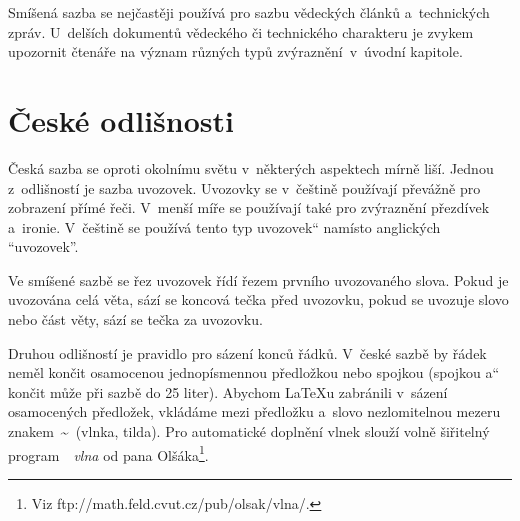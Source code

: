 \documentclass[a4paper, 11pt, twocolumn]{article}
\newcommand{\myuv}[1]{\quotedblbase #1\textquotedblleft}
\begin{document}
Smíšená sazba se nejčastěji používá pro sazbu vě\-dec\-kých článků a~technických zpráv. U~delších do\-ku\-men\-tů vědeckého či technického charakteru je zvykem upozornit čtenáře na význam různých typů zvý\-raz\-ně\-ní~v~úvodní kapitole.

\section{České odlišnosti}
Česká sazba se oproti okolnímu světu v~některých aspektech mírně liší. Jednou z~odlišností je sazba uvozovek. Uvozovky se v~češtině používají převážně pro zobrazení přímé řeči. V~menší míře se používají také pro zvýraznění přezdívek a~ironie. V~češtině se po\-u\-ží\-vá tento \myuv{typ uvozovek} namísto anglických ``uvozovek''.

Ve smíšené sazbě se řez uvozovek řídí řezem prv\-ní\-ho uvozovaného slova. Pokud je uvozována celá věta, sází se koncová tečka před uvozovku, pokud se uvozuje slovo nebo část věty, sází se tečka za uvozovku.

Druhou odlišností je pravidlo pro sázení konců řádků. V~české sazbě by řádek neměl končit osamocenou jednopísmennou předložkou nebo spojkou (spojkou \myuv{a} končit může při sazbě do 25 liter). Abychom \LaTeX u zabránili v~sázení osamocených předložek, vkládáme mezi předložku a~slovo nezlomitelnou mezeru znakem \,\~{}\, (vlnka, tilda). Pro automatické do\-plnění vlnek slouží volně šiřitelný program ~\,\emph{vlna} od pana Olšáka\footnote{Viz ftp://math.feld.cvut.cz/pub/olsak/vlna/.}.
\end{document}
